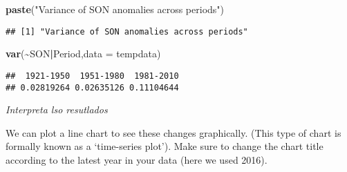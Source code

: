 \documentclass[
]{article}
\newenvironment{Shaded}{\begin{snugshade}}{\end{snugshade}}
\newcommand{\AttributeTok}[1]{\textcolor[rgb]{0.13,0.29,0.53}{#1}}
\newcommand{\FunctionTok}[1]{\textcolor[rgb]{0.13,0.29,0.53}{\textbf{#1}}}
\newcommand{\NormalTok}[1]{#1}
\newcommand{\SpecialCharTok}[1]{\textcolor[rgb]{0.81,0.36,0.00}{\textbf{#1}}}
\newcommand{\StringTok}[1]{\textcolor[rgb]{0.31,0.60,0.02}{#1}}
\begin{document}
\begin{Shaded}
\begin{Highlighting}[]
\FunctionTok{paste}\NormalTok{(}\StringTok{"Variance of SON anomalies across periods"}\NormalTok{)}
\end{Highlighting}
\end{Shaded}

\begin{verbatim}
## [1] "Variance of SON anomalies across periods"
\end{verbatim}

\begin{Shaded}
\begin{Highlighting}[]
\FunctionTok{var}\NormalTok{(}\SpecialCharTok{\textasciitilde{}}\NormalTok{SON}\SpecialCharTok{|}\NormalTok{Period,}\AttributeTok{data =}\NormalTok{ tempdata)}
\end{Highlighting}
\end{Shaded}

\begin{verbatim}
##  1921-1950  1951-1980  1981-2010 
## 0.02819264 0.02635126 0.11104644
\end{verbatim}

\emph{Interpreta lso resutlados}

We can plot a line chart to see these changes graphically. (This type of
chart is formally known as a `time-series plot'). Make sure to change
the chart title according to the latest year in your data (here we used
2016).
\end{document}
